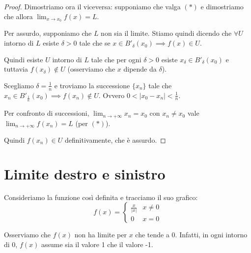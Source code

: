 \begin{proof}
Dimostriamo ora il viceversa: supponiamo che valga $(*)$ e dimostriamo che allora $\lim_{x \to x_0} f(x) = L$.

Per assurdo, supponiamo che $L$ non sia il limite. Stiamo quindi dicendo che $\forall U$ intorno di $L$ esiste $\delta > 0$ tale che se $x \in B'_\delta (x_0) \implies f(x) \in U$.

Quindi esiste $U$ intorno di $L$ tale che per ogni $\delta > 0$ esiste $x_\delta \in B'_\delta (x_0)$ e tuttavia $f(x_\delta) \notin U$ (osserviamo che $x$ dipende da $\delta$).

Scegliamo $\delta = \frac{1}{n}$ e troviamo la successione $\{x_n\}$ tale che $x_n \in B'_{\frac{1}{n}} (x_0) \implies f (x_n) \notin U$. Ovvero $0 < |x_0 - x_n| < \frac{1}{n}$.

Per confronto di successioni, $\lim_{n \to +\infty} x_n = x_0$ con $x_n \neq x_0$ vale $\lim_{n \to +\infty} f(x_n) = L$ (per $(*)$).

Quindi $f(x_n) \in U$ definitivamente, che è assurdo.
\end{proof}

\section{Limite destro e sinistro}

\begin{example}
Consideriamo la funzione così definita e tracciamo il suo grafico:
\begin{equation*}
f(x) = \begin{cases}
\frac{x}{|x|} & x \neq 0 \\
0 & x = 0
\end{cases}
\end{equation*}

\begin{center}
\end{center}

Osserviamo che $f(x)$ non ha limite per $x$ che tende a 0. Infatti, in ogni intorno di 0, $f(x)$ assume sia il valore 1 che il valore -1.
\end{example}

